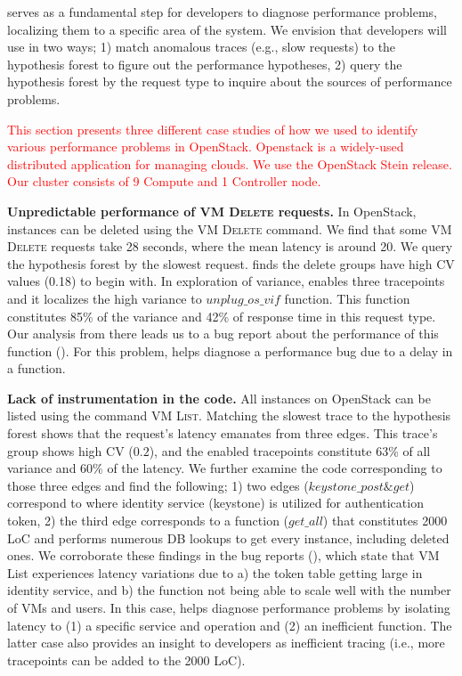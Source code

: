 
\staif{} serves as a fundamental step for developers to
diagnose performance problems, localizing them to a specific area of
the system.  We envision that developers will use \staif{} in two ways;
1) match anomalous traces (e.g., slow requests) to the hypothesis
forest to figure out the performance hypotheses, 2) query the
hypothesis forest by the request type to inquire about the sources of
performance problems.

\textcolor{red}{
This section presents three different case studies of how we used \STAIF{} to
identify various performance problems in OpenStack. Openstack is a widely-used distributed application for
managing clouds.  We use the OpenStack Stein release.  Our cluster
consists of 9 Compute and 1 Controller node.}

\noindent\textbf{Unpredictable performance of \textsc{VM Delete} requests.}
In OpenStack, instances can be deleted using the \textsc{VM Delete} command. 
We find that some \textsc{VM Delete} requests take 28 seconds, where the mean latency is around 20.
We query the hypothesis forest by the slowest request.
\staif{} finds the delete groups have high CV values (0.18) to begin with.
In exploration of variance, \staif{} enables three tracepoints and 
it localizes the high variance to $unplug\_os\_vif$ function. %
This function constitutes 85\% of the variance and 42\% of response time in this request type.
Our analysis from there leads us to a bug report about the performance of this function (\cite{vifplug1,vifplug2}). %
For this problem, \staif{} helps diagnose a performance
bug due to a delay in a function. 


\noindent\textbf{Lack of instrumentation in the code. }
All instances on OpenStack can be listed using the command \textsc{VM List}.
Matching the slowest trace to the hypothesis forest shows that the request’s latency emanates from three edges. 
This trace's group shows high CV ($0.2$), and the enabled tracepoints constitute 63\% of all variance and 60\% of the latency.
We further examine the code corresponding to those three edges and find the following;
1) two edges ($keystone\_post \& get$) correspond to where identity service (keystone) is utilized for authentication token,
2) the third edge corresponds to a function ($get\_all$) that constitutes 2000 LoC and performs numerous DB lookups to get every instance, including deleted ones.
We corroborate these findings in the bug reports (\cite{listslow1,listslow2}),
 which state that {VM List} experiences latency variations due to  a) the token table getting large in identity service, and 
 b) the function not being able to scale well with the number of VMs and users.
In this case, \staif{} helps diagnose performance problems by isolating latency to (1) a specific service and operation and (2) an inefficient function. 
The latter case also provides an insight to developers as inefficient tracing (i.e., more tracepoints can be added to the 2000 LoC).

